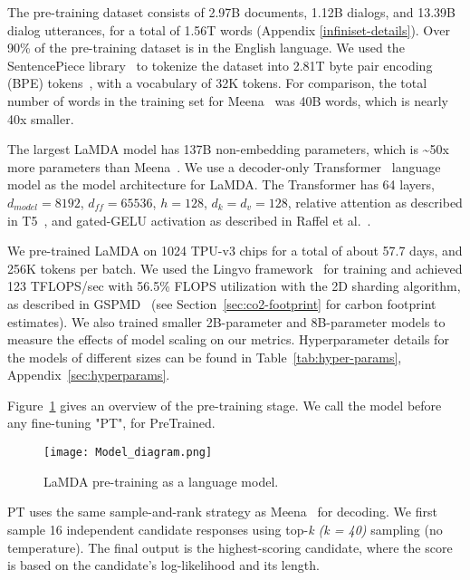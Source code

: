 \documentclass{article}
\begin{document}
The pre-training dataset consists of 2.97B documents, 1.12B dialogs, and 13.39B dialog utterances, for a total of 1.56T words (Appendix \ref{infiniset-details}). Over 90\% of the pre-training dataset is in the English language. We used the SentencePiece library~\cite{sentencepiece} to tokenize the dataset into 2.81T byte pair encoding (BPE) tokens~\cite{sennrich2015neural}, with a vocabulary of 32K tokens. For comparison, the total number of words in the training set for Meena~\cite{adiwardana2020humanlike} was 40B words, which is nearly 40x smaller. 

The largest LaMDA model has 137B non-embedding parameters, which is {\textasciitilde}50x more parameters than Meena~\cite{adiwardana2020humanlike}. We use a decoder-only Transformer~\cite{Vaswani2017AttentionIA} language model as the model architecture for LaMDA. The Transformer has 64 layers, $d_{model}=8192$, $d_{ff}=65536$, $h=128$, $d_k=d_v=128$, relative attention as described in T5~\cite{t5}, and gated-GELU activation as described in Raffel et al.~\cite{shazeer2020glu}.

We pre-trained LaMDA on 1024 TPU-v3 chips for a total of about 57.7 days, and 256K tokens per batch. We used the Lingvo framework~\cite{shen2019lingvo} for training and achieved 123 TFLOPS/sec with 56.5\% FLOPS utilization with the 2D sharding algorithm, as described in GSPMD~\cite{gspmd21} (see Section~\ref{sec:co2-footprint} for carbon footprint estimates). We also trained smaller 2B-parameter and 8B-parameter models to measure the effects of model scaling on our metrics. Hyperparameter details for the models of different sizes can be found in Table~\ref{tab:hyper-params}, Appendix~\ref{sec:hyperparams}.

Figure~\ref{fig:LaMDA-pretrain} gives an overview of the pre-training stage. We call the model before any fine-tuning "PT", for PreTrained.

\begin{figure}[h!]
    \centering
\texttt{[image: Model\_diagram.png]}
    \caption{LaMDA pre-training as a language model.
    }
    \label{fig:LaMDA-pretrain}
\end{figure}

PT uses the same sample-and-rank strategy as Meena~\cite{adiwardana2020humanlike} for decoding. We first sample 16 independent candidate responses using top-\textit{k (k = 40)} sampling (no temperature). The final output is the highest-scoring candidate, where the score is based on the candidate’s log-likelihood and its length. 
\end{document}
